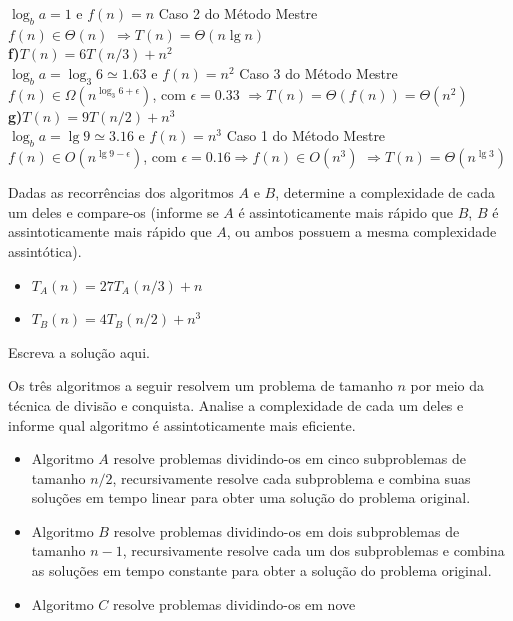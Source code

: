\documentclass[a4paper]{exam}
\begin{document}
\begin{questions}
\begin{solution}
      $\log_b a = 1 $ e $f(n) = n$ \Rightarrow  Caso 2 do Método Mestre\\
      $f(n) \in \Theta(n)$
      $\Rightarrow T(n) = \Theta(n\lg n)$\\
    \textbf{f)$T(n) = 6T(n/3) + n^2$}\\
      $\log_b a = \log_3 6 \simeq 1.63$ e $f(n) = n^2$ \Rightarrow  Caso 3 do Método Mestre\\
      $f(n) \in \Omega(n^{\log_3 6 + \epsilon})$, com $\epsilon = 0.33$
      $\Rightarrow T(n) = \Theta(f(n)) = \Theta(n^2)$\\
    \textbf{g)$T(n) = 9T(n/2) + n^3$}\\
      $\log_b a = \lg 9 \simeq 3.16$ e $f(n) = n^3$ \Rightarrow  Caso 1 do Método Mestre\\
      $f(n) \in O(n^{\lg 9 - \epsilon})$, com $\epsilon = 0.16 \Rightarrow f(n) \in O(n^3)$
      $\Rightarrow T(n) = \Theta(n^{\lg 3})$
  \end{solution}
  \question Dadas as recorrências dos algoritmos $A$ e
  $B$, determine a complexidade de cada um deles e compare-os
  (informe se $A$ é assintoticamente mais rápido que $B$, $B$
  é assintoticamente mais rápido que $A$, ou ambos possuem a
  mesma complexidade assintótica).
  \begin{itemize}
  \item $T_A(n) = 27T_A(n/3) + n$
  \item $T_B(n) = 4T_B(n/2) + n^3$
  \end{itemize}
  \begin{solution}
    Escreva a solução aqui.
  \end{solution}
  \question Os três algoritmos a seguir resolvem um
  problema de tamanho $n$ por meio da técnica de divisão e conquista.
  Analise a complexidade de cada um deles e informe qual algoritmo é
  assintoticamente mais eficiente.
  \begin{itemize}
  \item Algoritmo $A$ resolve problemas dividindo-os em cinco
    subproblemas de tamanho $n/2$, recursivamente resolve cada
    subproblema e combina suas soluções em tempo linear para obter
    uma solução do problema original.
    \item Algoritmo $B$ resolve problemas dividindo-os em dois
      subproblemas de tamanho $n-1$, recursivamente resolve cada um
      dos subproblemas e combina as soluções em tempo constante para
      obter a solução do problema original.
    \item Algoritmo $C$ resolve problemas dividindo-os em nove 

\end{itemize}
\end{questions}
\end{document}
